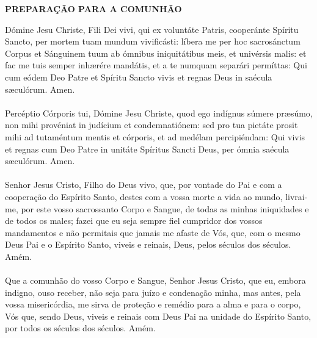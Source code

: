\newpage
\begin{center}
	\textbf{PREPARAÇÃO PARA A COMUNHÃO}
\end{center}
\begin{multicols}{2}
	\noindent Dómine Jesu Christe, Fili Dei vivi, qui ex voluntáte Patris, cooperánte Spíritu Sancto, per mortem tuam mundum vivificásti: líbera me per hoc sacrosánctum Corpus et Sánguinem tuum ab ómnibus iniquitátibus meis, et univérsis malis: et fac me tuis semper inhærére mandátis, et a te numquam separári permíttas: Qui cum eódem Deo Patre et Spíritu Sancto vivis et regnas Deus in saécula sæculórum. Amen.
	\\
	\\ Percéptio Córporis tui, Dómine Jesu Christe, quod ego indígnus súmere præsúmo, non mihi provéniat in judícium et condemnatiónem: sed pro tua pietáte prosit mihi ad tutaméntum mentis et córporis, et ad medélam percipiéndam: Qui vivis et regnas cum Deo Patre in unitáte Spíritus Sancti Deus, per ómnia saécula sæculórum. Amen.
	\\
	\\Senhor Jesus Cristo, Filho do Deus vivo, que, por vontade do Pai e com a cooperação do Espírito Santo, destes com a vossa morte a vida ao mundo, livrai-me, por este vosso sacrossanto Corpo e Sangue, de todas as minhas iniquidades e de todos os males; fazei que eu seja sempre fiel cumpridor dos vossos mandamentos e não permitais que jamais me afaste de Vós, que, com o mesmo Deus Pai e o Espírito Santo, viveis e reinais, Deus, pelos séculos dos séculos. Amém.
	\\
	\\ Que a comunhão do vosso Corpo e Sangue, Senhor Jesus Cristo, que eu, embora indigno, ouso receber, não seja para juízo e condenação minha, mas antes, pela vossa misericórdia, me sirva de proteção e remédio para a alma e para o corpo, Vós que, sendo Deus, viveis e reinais com Deus Pai na unidade do Espírito Santo, por todos os séculos dos séculos. Amém.
\end{multicols}

